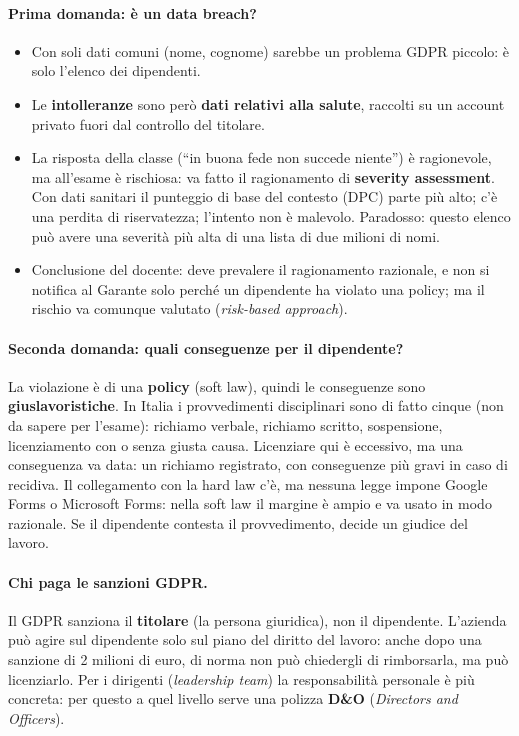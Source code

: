 \paragraph{Prima domanda: è un data breach?}
\begin{itemize}
  \item Con soli dati comuni (nome, cognome) sarebbe un problema GDPR piccolo: è solo l'elenco dei
    dipendenti.
  \item Le \textbf{intolleranze} sono però \textbf{dati relativi alla salute}, raccolti su un account
    privato fuori dal controllo del titolare.
  \item La risposta della classe (``in buona fede non succede niente'') è ragionevole, ma all'esame è
    rischiosa: va fatto il ragionamento di \textbf{severity assessment}. Con dati sanitari il punteggio
    di base del contesto (DPC) parte più alto; c'è una perdita di riservatezza; l'intento non è malevolo.
    Paradosso: questo elenco può avere una severità più alta di una lista di due milioni di nomi.
  \item Conclusione del docente: deve prevalere il ragionamento razionale, e non si notifica al Garante
    solo perché un dipendente ha violato una policy; ma il rischio va comunque valutato
    (\emph{risk-based approach}).
\end{itemize}

\paragraph{Seconda domanda: quali conseguenze per il dipendente?}
La violazione è di una \textbf{policy} (soft law), quindi le conseguenze sono
\textbf{giuslavoristiche}. In Italia i provvedimenti disciplinari sono di fatto cinque (non da sapere
per l'esame): richiamo verbale, richiamo scritto, sospensione, licenziamento con o senza giusta causa.
Licenziare qui è eccessivo, ma una conseguenza va data: un richiamo registrato, con conseguenze più
gravi in caso di recidiva. Il collegamento con la hard law c'è, ma nessuna legge impone Google Forms o
Microsoft Forms: nella soft law il margine è ampio e va usato in modo razionale. Se il dipendente
contesta il provvedimento, decide un giudice del lavoro.

\paragraph{Chi paga le sanzioni GDPR.}
Il GDPR sanziona il \textbf{titolare} (la persona giuridica), non il dipendente. L'azienda può agire sul
dipendente solo sul piano del diritto del lavoro: anche dopo una sanzione di 2 milioni di euro, di norma
non può chiedergli di rimborsarla, ma può licenziarlo. Per i dirigenti (\emph{leadership team}) la
responsabilità personale è più concreta: per questo a quel livello serve una polizza \textbf{D\&O}
(\emph{Directors and Officers}).

